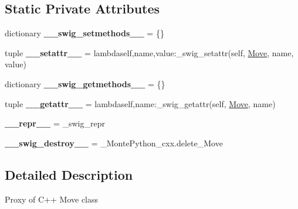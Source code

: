 \subsection*{Static Private Attributes}
\begin{DoxyCompactItemize}
\item 
\hypertarget{classMontePython__cxx_1_1Move_a8b8f3bc5d4ee776cb6f6f49c9d0ed35b}{}dictionary {\bfseries \+\_\+\+\_\+swig\+\_\+setmethods\+\_\+\+\_\+} = \{\}\label{classMontePython__cxx_1_1Move_a8b8f3bc5d4ee776cb6f6f49c9d0ed35b}

\item 
\hypertarget{classMontePython__cxx_1_1Move_ab98d7ea2afcdc0efe22d97e2f65b1c8d}{}tuple {\bfseries \+\_\+\+\_\+setattr\+\_\+\+\_\+} = lambdaself,name,value\+:\+\_\+swig\+\_\+setattr(self, \hyperlink{classMontePython__cxx_1_1Move}{Move}, name, value)\label{classMontePython__cxx_1_1Move_ab98d7ea2afcdc0efe22d97e2f65b1c8d}

\item 
\hypertarget{classMontePython__cxx_1_1Move_af0e511bcf40d2dacee77ba9c69c7c8c3}{}dictionary {\bfseries \+\_\+\+\_\+swig\+\_\+getmethods\+\_\+\+\_\+} = \{\}\label{classMontePython__cxx_1_1Move_af0e511bcf40d2dacee77ba9c69c7c8c3}

\item 
\hypertarget{classMontePython__cxx_1_1Move_a194278877087c00e1433724e33ac43e4}{}tuple {\bfseries \+\_\+\+\_\+getattr\+\_\+\+\_\+} = lambdaself,name\+:\+\_\+swig\+\_\+getattr(self, \hyperlink{classMontePython__cxx_1_1Move}{Move}, name)\label{classMontePython__cxx_1_1Move_a194278877087c00e1433724e33ac43e4}

\item 
\hypertarget{classMontePython__cxx_1_1Move_a7d8b49bc708602121c334849502f468b}{}{\bfseries \+\_\+\+\_\+repr\+\_\+\+\_\+} = \+\_\+swig\+\_\+repr\label{classMontePython__cxx_1_1Move_a7d8b49bc708602121c334849502f468b}

\item 
\hypertarget{classMontePython__cxx_1_1Move_a696fccbe5ed5ef9f39619ef25b1d157b}{}{\bfseries \+\_\+\+\_\+swig\+\_\+destroy\+\_\+\+\_\+} = \+\_\+\+Monte\+Python\+\_\+cxx.\+delete\+\_\+\+Move\label{classMontePython__cxx_1_1Move_a696fccbe5ed5ef9f39619ef25b1d157b}

\end{DoxyCompactItemize}


\subsection{Detailed Description}
\begin{DoxyVerb}Proxy of C++ Move class\end{DoxyVerb}
 

